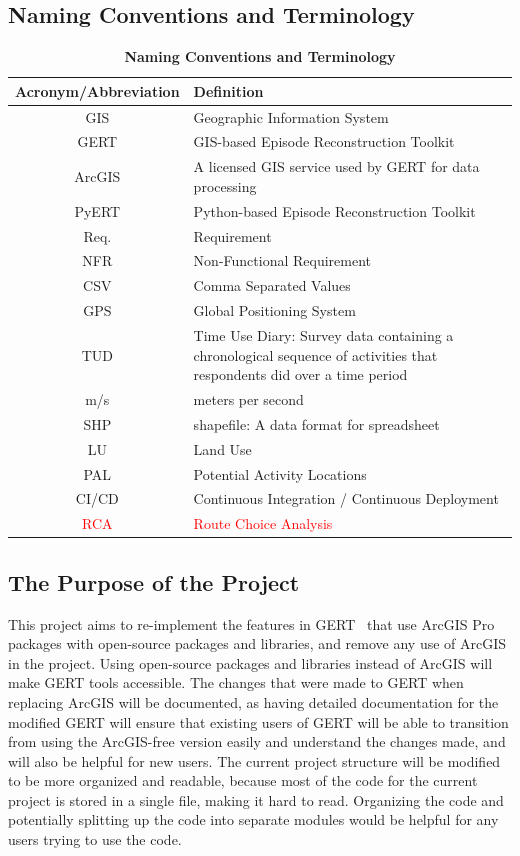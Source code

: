 \documentclass[12pt, titlepage]{article}
\begin{document}
\subsection{Naming Conventions and Terminology}
\begin{table}[h]
\centering
\begin{tabular}{|c|p{10cm}|}
 \hline
 {\bf Acronym/Abbreviation} & {\bf Definition} \\
 \hline
 GIS & Geographic Information System \\
 \hline
 GERT & GIS-based Episode Reconstruction Toolkit  \\ 
\hline
 ArcGIS & A licensed GIS service used by GERT for data processing \\
 \hline
 PyERT & Python-based Episode Reconstruction Toolkit  \\ 
 \hline
 Req. & Requirement  \\
 \hline
 NFR & Non-Functional Requirement  \\
 \hline 
 CSV & Comma Separated Values \\
 \hline
 GPS & Global Positioning System \\
 \hline
 TUD & Time Use Diary:  Survey data containing a chronological sequence of activities that respondents did over a time period\\
 \hline
 m/s & meters per second\\
 \hline
 SHP & shapefile: A data format for spreadsheet \\ 
 \hline
 LU & Land Use \\ 
 \hline
 PAL & Potential Activity Locations \\ 
 \hline
 CI/CD & Continuous Integration / Continuous Deployment\\
 \hline
 \textcolor{red}{RCA} & \textcolor{red}{Route Choice Analysis} \\
 \hline
\end{tabular}
\caption{\bf Naming Conventions and Terminology}
\end{table}

\subsection{The Purpose of the Project}
This project aims to re-implement the features in GERT~\citep{DALUMPINES2018121} that use ArcGIS Pro packages with
open-source packages and libraries, and remove any use of ArcGIS in the project. Using open-source packages and libraries instead of ArcGIS will make GERT tools accessible. The changes that were made to GERT when replacing ArcGIS will be documented, as having detailed documentation for the modified GERT will ensure that existing users of GERT will be able to transition from using the ArcGIS-free version easily and understand the changes made, and will also be helpful for new users. The current project structure will be modified to be more organized and readable, because most of the code for the current project is stored in a single file, making it hard to read. Organizing the code and potentially splitting up the code into separate modules would be helpful for any users trying to use the code.
\end{document}
